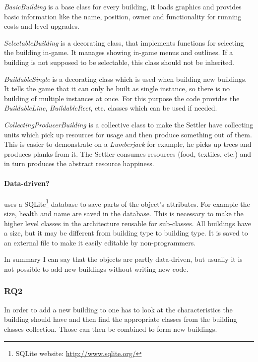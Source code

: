 \textit{BasicBuilding} is a base class for every building, it loads graphics and provides
basic information like the name, position, owner and functionality for running costs and level upgrades.

\textit{SelectableBuilding} is a decorating class, that implements functions for selecting the building in-game. It
manages showing in-game menus and outlines. If a building is not supposed to be selectable, this class should not be
inherited.

\textit{BuildableSingle} is a decorating class which is used when building new buildings. It tells the game that it can
only be built as single instance, so there is no building of multiple instances at once. For this purpose the code
provides the \textit{BuildableLine}, \textit{BuildableRect}, etc. classes which can be used if needed.

\textit{CollectingProducerBuilding} is a collective class to make the Settler have collecting units which pick up
resources for usage and then produce something out of them. This is easier to demonstrate on a \textit{Lumberjack} for
example, he picks up trees and produces planks from it. The Settler consumes resources (food, textiles, etc.) and in
turn produces the abstract resource happiness.

\paragraph{Data-driven?}
\UH{} uses a SQLite\footnote{SQLite website: \url{http://www.sqlite.org/}} database to save parts of the object's
attributes. For example the size, health and name are saved in the database. This is necessary to make the higher level
classes in the architecture reusable for sub-classes. All buildings have a size, but it may be different from building
type to building type. It is saved to an external file to make it easily editable by non-programmers.

In summary I can say that the objects are partly data-driven, but usually it is not possible to add new buildings
without writing new code.

\subsubsection{RQ2}
In order to add a new building to \UH{} one has to look at the characteristics the building should have and
then find the appropriate classes from the \UH{} building classes collection. Those can then be combined to
form new buildings.

